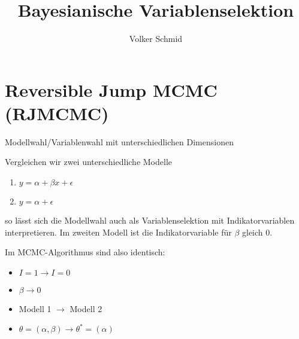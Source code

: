\documentclass[ignorenonframetext,]{beamer}
\title{Bayesianische Variablenselektion}
\author{Volker Schmid}
\date{\begin{enumerate}
\def\labelenumi{\arabic{enumi}.}
\setcounter{enumi}{9}
\tightlist
\item
  Juli 2017
\end{enumerate}}
\providecommand{\tightlist}{%
\setlength{\itemsep}{0pt}\setlength{\parskip}{0pt}}
\def\labelenumi{\arabic{enumi}.}
\begin{document}
\frame{\titlepage}

\begin{frame}
\tableofcontents[hideallsubsections]
\end{frame}

\section{Reversible Jump MCMC
(RJMCMC)}\label{reversible-jump-mcmc-rjmcmc}

\begin{frame}{Modellwahl/Variablenwahl mit unterschiedlichen
Dimensionen}

Vergleichen wir zwei unterschiedliche Modelle

\begin{enumerate}
\def\labelenumi{\arabic{enumi}.}
\tightlist
\item
  \(y = \alpha + \beta x + \epsilon\)
\item
  \(y = \alpha + \epsilon\)
\end{enumerate}

so lässt sich die Modellwahl auch als Variablenselektion mit
Indikatorvariablen interpretieren. Im zweiten Modell ist die
Indikatorvariable für \(\beta\) gleich 0.

Im MCMC-Algorithmus sind also identisch:

\begin{itemize}
\tightlist
\item
  \(I=1 \to I=0\)
\item
  \(\beta \to 0\)
\item
  Modell 1 \(\to\) Modell 2
\item
  \(\theta=(\alpha,\beta) \to \theta^*=(\alpha)\)
\end{itemize}

\end{frame}
\end{document}
